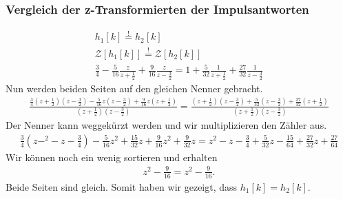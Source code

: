 \documentclass[11pt,a4paper,DIV=12]{scrartcl}
\begin{document}
\subsubsection*{Vergleich der z-Transformierten der Impulsantworten}
\begin{gather}
	h_1[k]\overset{!}{=}h_2[k]\\
	\mathcal{Z}[h_1[k]]\overset{!}{=}\mathcal{Z}[h_2[k]]\\
	\frac{3}{4}-\frac{5}{16}\frac{z}{z+\frac{1}{2}}+\frac{9}{16}\frac{z}{z-\frac{3}{2}}=1+\frac{5}{32}\frac{1}{z+\frac{1}{2}}+\frac{27}{32}\frac{1}{z-\frac{3}{2}}
\end{gather}
Nun werden beiden Seiten auf den gleichen Nenner gebracht.
\begin{gather}
	\frac{\frac{3}{4}(z+\frac{1}{2})(z-\frac{3}{2})-\frac{5}{16}z(z-\frac{3}{2})+\frac{9}{16}z(z+\frac{1}{2})}{(z+\frac{1}{2})(z-\frac{3}{2})}=\frac{(z+\frac{1}{2})(z-\frac{3}{2})+\frac{5}{32}(z-\frac{3}{2})+\frac{27}{32}(z+\frac{1}{2})}{(z+\frac{1}{2})(z-\frac{3}{2})}
\end{gather}
Der Nenner kann weggekürzt werden und wir multiplizieren den Zähler aus.
\begin{gather}
	\frac{3}{4}(z-^2-z-\frac{3}{4})-\frac{5}{16}z^2+\frac{15}{32}z+\frac{9}{16}z^2+\frac{9}{32}z=z^2-z-\frac{3}{4}+\frac{5}{32}z-\frac{15}{64}+\frac{27}{32}z+\frac{27}{64}
\end{gather}
Wir können noch ein wenig sortieren und erhalten
\begin{gather}
	z^2-\frac{9}{16}=z^2-\frac{9}{16}.
\end{gather}
Beide Seiten sind gleich. Somit haben wir gezeigt, dass $h_1[k]=h_2[k]$.
\renewcommand{\refname}{Buchzitate}
\clearpage

\end{document}
